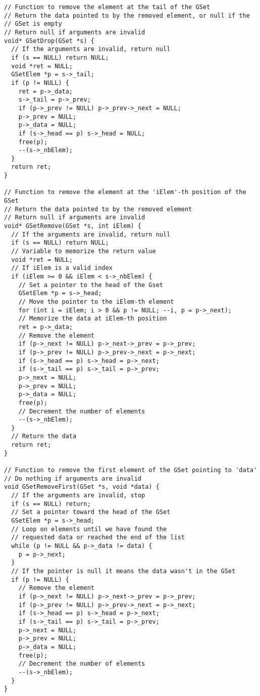 \documentclass[12pt, a4paper]{article}
\begin{document}
\begin{scriptsize}
\begin{ttfamily}
\begin{lstlisting}
// Function to remove the element at the tail of the GSet
// Return the data pointed to by the removed element, or null if the 
// GSet is empty
// Return null if arguments are invalid
void* GSetDrop(GSet *s) {
  // If the arguments are invalid, return null
  if (s == NULL) return NULL;
  void *ret = NULL;
  GSetElem *p = s->_tail;
  if (p != NULL) {
    ret = p->_data;
    s->_tail = p->_prev;
    if (p->_prev != NULL) p->_prev->_next = NULL;
    p->_prev = NULL;
    p->_data = NULL;
    if (s->_head == p) s->_head = NULL;
    free(p);
    --(s->_nbElem);
  }
  return ret;
}

// Function to remove the element at the 'iElem'-th position of the GSet
// Return the data pointed to by the removed element
// Return null if arguments are invalid
void* GSetRemove(GSet *s, int iElem) {
  // If the arguments are invalid, return null
  if (s == NULL) return NULL;
  // Variable to memorize the return value
  void *ret = NULL;
  // If iElem is a valid index
  if (iElem >= 0 && iElem < s->_nbElem) {
    // Set a pointer to the head of the Gset
    GSetElem *p = s->_head;
    // Move the pointer to the iElem-th element
    for (int i = iElem; i > 0 && p != NULL; --i, p = p->_next);
    // Memorize the data at iElem-th position
    ret = p->_data;
    // Remove the element
    if (p->_next != NULL) p->_next->_prev = p->_prev;
    if (p->_prev != NULL) p->_prev->_next = p->_next;
    if (s->_head == p) s->_head = p->_next;
    if (s->_tail == p) s->_tail = p->_prev;
    p->_next = NULL;
    p->_prev = NULL;
    p->_data = NULL;
    free(p);
    // Decrement the number of elements
    --(s->_nbElem);
  }
  // Return the data
  return ret;
}

// Function to remove the first element of the GSet pointing to 'data'
// Do nothing if arguments are invalid
void GSetRemoveFirst(GSet *s, void *data) {
  // If the arguments are invalid, stop
  if (s == NULL) return;
  // Set a pointer toward the head of the GSet
  GSetElem *p = s->_head;
  // Loop on elements until we have found the 
  // requested data or reached the end of the list
  while (p != NULL && p->_data != data) {
    p = p->_next;
  }
  // If the pointer is null it means the data wasn't in the GSet
  if (p != NULL) {
    // Remove the element
    if (p->_next != NULL) p->_next->_prev = p->_prev;
    if (p->_prev != NULL) p->_prev->_next = p->_next;
    if (s->_head == p) s->_head = p->_next;
    if (s->_tail == p) s->_tail = p->_prev;
    p->_next = NULL;
    p->_prev = NULL;
    p->_data = NULL;
    free(p);
    // Decrement the number of elements
    --(s->_nbElem);
  }
}


\end{lstlisting}
\end{ttfamily}
\end{scriptsize}
\end{document}
